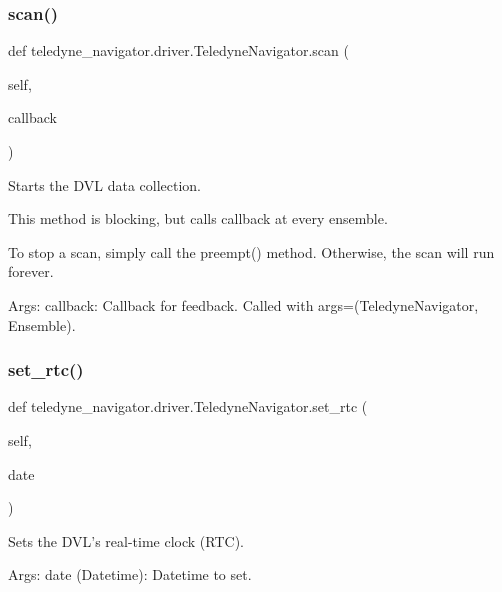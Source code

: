 \subsubsection{\texorpdfstring{scan()}{scan()}}
{\footnotesize\ttfamily def teledyne\+\_\+navigator.\+driver.\+Teledyne\+Navigator.\+scan (\begin{DoxyParamCaption}\item[{}]{self,  }\item[{}]{callback }\end{DoxyParamCaption})}

\begin{DoxyVerb}Starts the DVL data collection.

This method is blocking, but calls callback at every ensemble.

To stop a scan, simply call the preempt() method. Otherwise, the scan
will run forever.

Args:
    callback: Callback for feedback.
Called with args=(TeledyneNavigator, Ensemble).
\end{DoxyVerb}
 \mbox{\label{classteledyne__navigator_1_1driver_1_1TeledyneNavigator_a8ba38b5d0ea4f9befed369fd150ab991}} 
\subsubsection{\texorpdfstring{set\+\_\+rtc()}{set\_rtc()}}
{\footnotesize\ttfamily def teledyne\+\_\+navigator.\+driver.\+Teledyne\+Navigator.\+set\+\_\+rtc (\begin{DoxyParamCaption}\item[{}]{self,  }\item[{}]{date }\end{DoxyParamCaption})}

\begin{DoxyVerb}Sets the DVL's real-time clock (RTC).

Args:
    date (Datetime): Datetime to set.
\end{DoxyVerb}
 \mbox{\label{classteledyne__navigator_1_1driver_1_1TeledyneNavigator_aab52bb45e1e056cae53c8cd284bb7dd8}} 
